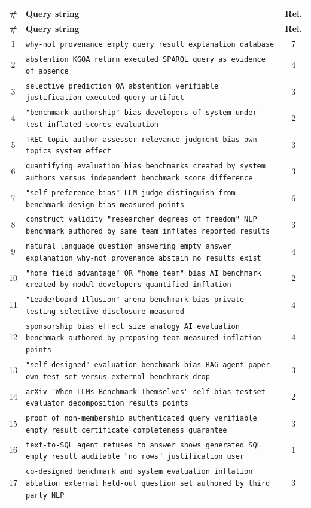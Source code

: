 \documentclass[11pt,a4paper]{article}
\begin{document}
\begin{center}
\footnotesize
\begin{longtable}{@{}c>{\RaggedRight}p{13.6cm}c@{}}
\toprule
\textbf{\#} & \textbf{Query string} & \textbf{Rel.} \\
\midrule
\endfirsthead
\toprule
\textbf{\#} & \textbf{Query string} & \textbf{Rel.} \\
\midrule
\endhead
1 & \texttt{why-not provenance empty query result explanation database} & 7 \\
2 & \texttt{abstention KGQA return executed SPARQL query as evidence of absence} & 4 \\
3 & \texttt{selective prediction QA abstention verifiable justification executed query artifact} & 3 \\
4 & \texttt{"benchmark authorship" bias developers of system under test inflated scores evaluation} & 2 \\
5 & \texttt{TREC topic author assessor relevance judgment bias own topics system effect} & 3 \\
6 & \texttt{quantifying evaluation bias benchmarks created by system authors versus independent benchmark score difference} & 3 \\
7 & \texttt{"self-preference bias" LLM judge distinguish from benchmark design bias measured points} & 6 \\
8 & \texttt{construct validity "researcher degrees of freedom" NLP benchmark authored by same team inflates reported results} & 3 \\
9 & \texttt{natural language question answering empty answer explanation why-not provenance abstain no results exist} & 4 \\
10 & \texttt{"home field advantage" OR "home team" bias AI benchmark created by model developers quantified inflation} & 2 \\
11 & \texttt{"Leaderboard Illusion" arena benchmark bias private testing selective disclosure measured} & 4 \\
12 & \texttt{sponsorship bias effect size analogy AI evaluation benchmark authored by proposing team measured inflation points} & 4 \\
13 & \texttt{"self-designed" evaluation benchmark bias RAG agent paper own test set versus external benchmark drop} & 3 \\
14 & \texttt{arXiv "When LLMs Benchmark Themselves" self-bias testset evaluator decomposition results points} & 2 \\
15 & \texttt{proof of non-membership authenticated query verifiable empty result certificate completeness guarantee} & 3 \\
16 & \texttt{text-to-SQL agent refuses to answer shows generated SQL empty result auditable "no rows" justification user} & 1 \\
17 & \texttt{co-designed benchmark and system evaluation inflation ablation external held-out question set authored by third party NLP} & 3 \\
\bottomrule
\end{longtable}
\end{center}
\end{document}

